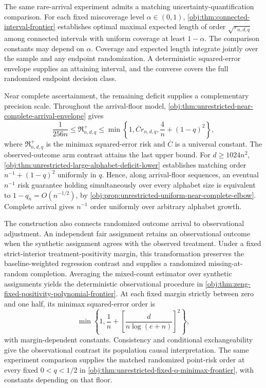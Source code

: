 \documentclass[11pt]{article}
\begin{document}
The same rare-arrival experiment admits a matching uncertainty-quantification comparison. For each fixed miscoverage level \(\alpha\in(0,1)\), \cref{obj:thm:connected-interval-frontier} establishes optimal maximal expected length of order \(\sqrt{r_{n,d,q}}\) among connected intervals with uniform coverage at least \(1-\alpha\). The comparison constants may depend on \(\alpha\). Coverage and expected length integrate jointly over the sample and any endpoint randomization. A deterministic squared-error envelope supplies an attaining interval, and the converse covers the full randomized endpoint decision class.

Near complete ascertainment, the remaining deficit supplies a complementary precision scale. Throughout the arrival-floor model, \cref{obj:thm:unrestricted-near-complete-arrival-envelope} gives
\[
\frac{1}{256n}
\le \mathfrak R^{+}_{n,d,q}
\le
\min\left\{1,\overline C r_{n,d,q},
\frac4n+(1-q)^2\right\},
\]
where \(\mathfrak R^{+}_{n,d,q}\) is the minimax squared-error risk and \(\overline C\) is a universal constant. The observed-outcome arm contrast attains the last upper bound. For \(d\ge1024n^2\), \cref{obj:thm:unrestricted-large-alphabet-deficit-lower} establishes matching order \(n^{-1}+(1-q)^2\) uniformly in \(q\). Hence, along arrival-floor sequences, an eventual \(n^{-1}\) risk guarantee holding simultaneously over every alphabet size is equivalent to \(1-q_n=O(n^{-1/2})\), by \cref{obj:prop:unrestricted-uniform-near-complete-elbow}. Complete arrival gives \(n^{-1}\) order uniformly over arbitrary alphabet growth.

The construction also connects randomized outcome arrival to observational adjustment. An independent fair assignment retains an observational outcome when the synthetic assignment agrees with the observed treatment. Under a fixed strict-interior treatment-positivity margin, this transformation preserves the baseline-weighted regression contrast and supplies a randomized missing-at-random completion. Averaging the mixed-count estimator over synthetic assignments yields the deterministic observational procedure in \cref{obj:thm:zeng-fixed-positivity-polynomial-frontier}. At each fixed margin strictly between zero and one half, its minimax squared-error order is
\[
\min\left\{1,\frac1n+
\left[\frac{d}{n\log(e+n)}\right]^2\right\},
\]
with margin-dependent constants. Consistency and conditional exchangeability give the observational contrast its population causal interpretation. The same experiment comparison supplies the matched randomized point-risk order at every fixed \(0<q<1/2\) in \cref{obj:thm:unrestricted-fixed-q-minimax-frontier}, with constants depending on that floor.
\end{document}
